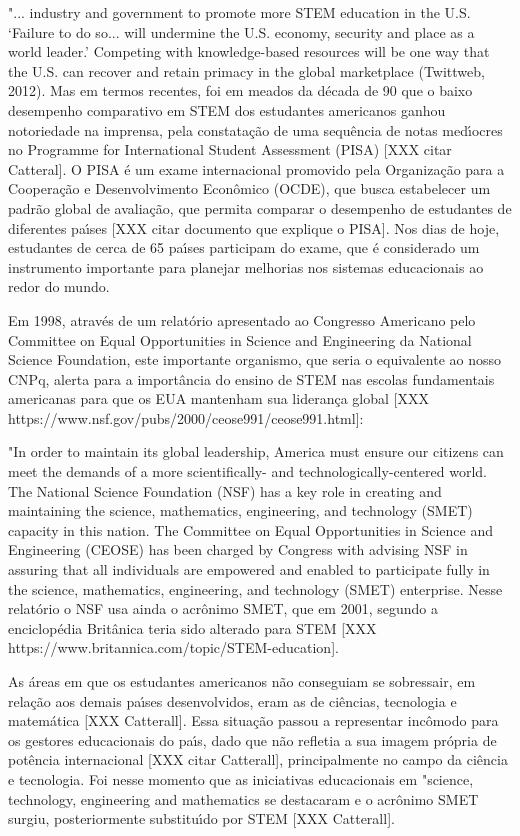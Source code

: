 \documentclass[
12pt,		%
openright,	%
twoside,  %
a4paper,			%
chapter=TITLE,		%
english,			%
french,				%
spanish,			%
brazil				%
]{USPSC-classe/USPSC}
\begin{document}
"... industry and government to promote more STEM education in the U.S. ‘Failure to do so... will undermine the U.S. economy, security and place as a world leader.’ Competing with knowledge-based resources will be one way that the U.S. can recover and retain primacy in the global marketplace (Twittweb, 2012).
Mas em termos recentes, foi em meados da d\'ecada de 90 que o baixo desempenho comparativo em STEM dos estudantes americanos ganhou notoriedade na imprensa, pela constata\c{c}\~ao de uma sequ\^encia de notas med\'{\i}ocres no Programme for International Student Assessment (PISA) [XXX citar Catteral]. O PISA \'e um exame internacional promovido pela Organiza\c{c}\~ao para a Coopera\c{c}\~ao e Desenvolvimento Econ\^omico (OCDE), que busca estabelecer um padr\~ao global de avalia\c{c}\~ao, que permita comparar o desempenho de estudantes de diferentes pa\'{\i}ses [XXX citar documento que explique o PISA]. Nos dias de hoje, estudantes de cerca de 65 pa\'{\i}ses participam do exame, que \'e considerado um instrumento importante para planejar melhorias nos sistemas educacionais ao redor do mundo.




Em 1998, atrav\'es de um relat\'orio apresentado ao Congresso Americano pelo Committee on Equal Opportunities in Science and Engineering da National Science Foundation, este importante organismo, que seria o equivalente ao nosso CNPq, alerta para a import\^ancia do ensino de STEM nas escolas fundamentais americanas para que os EUA mantenham sua lideran\c{c}a global [XXX https://www.nsf.gov/pubs/2000/ceose991/ceose991.html]:




"In order to maintain its global leadership, America must ensure our citizens can meet the demands of a more scientifically- and technologically-centered world. The National Science Foundation (NSF) has a key role in creating and maintaining the science, mathematics, engineering, and technology (SMET) capacity in this nation. The Committee on Equal Opportunities in Science and Engineering (CEOSE) has been charged by Congress with advising NSF in assuring that all individuals are empowered and enabled to participate fully in the science, mathematics, engineering, and technology (SMET) enterprise.
Nesse relat\'orio o NSF usa ainda o acr\^onimo SMET, que em 2001, segundo a enciclop\'edia Brit\^anica teria sido alterado para STEM [XXX https://www.britannica.com/topic/STEM-education].




As \'areas em que os estudantes americanos n\~ao conseguiam se sobressair, em rela\c{c}\~ao aos demais pa\'{\i}ses desenvolvidos, eram as de ci\^encias, tecnologia e matem\'atica [XXX Catterall]. Essa situa\c{c}\~ao passou a representar inc\^omodo para os gestores educacionais do pa\'{\i}s, dado que n\~ao refletia a sua imagem pr\'opria de pot\^encia internacional [XXX citar Catterall], principalmente no campo da ci\^encia e tecnologia. Foi nesse momento que as iniciativas educacionais em "science, technology, engineering and mathematics se destacaram e o acr\^onimo SMET surgiu, posteriormente substitu\'{\i}do por STEM [XXX  Catterall].
\end{document}
